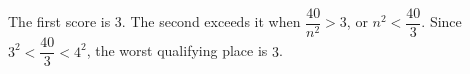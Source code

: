 The first score is 3. The second exceeds it when $\dfrac{40}{n^2}>3 $, or $ n^2<\dfrac{40}{3}$. Since $ 3^2<\dfrac{40}{3}<4^2 $, the worst qualifying place is $\boxed3 $.
